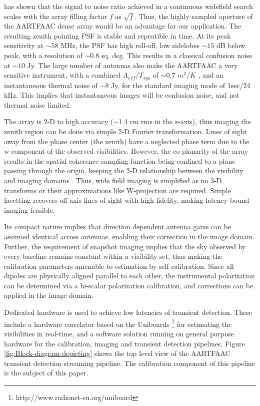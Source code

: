 \documentclass{aa}
\begin{document}
\citet{backer1999pers} has shown that  the signal to noise ratio achieved
in a  continuous widefield search  scales with the  array filling factor  $f$ as
$\sqrt{f}$. Thus, the highly sampled  aperture of the AARTFAAC dense array would
be an advantage for our application. The resulting zenith pointing PSF is stable
and repeatible in  time. At its peak sensitivity at $\sim$$58$  MHz, the PSF has
high  roll-off, low sidelobes  $\sim$$15$ dB  below peak,  with a  resolution of
$\sim$$0.8$ sq.  deg.  This results in a classical confusion noise at $\sim$$10$
Jy.   The large  number of  antennas  also make  the AARTFAAC  a very  sensitive
instrument,     with    a     combined     $A_{eff}/T_{sys}$    of     $\sim$0.7
$m^{2}/K$ \citep{wijnholds2011situ},  and  an   instantaneous  thermal  noise  of
$\sim$8 Jy,  for the standard  imaging mode of  1sec/24 kHz.  This  implies that
instantaneous images will be confusion noise, and not thermal noise limited.

The array is 2-D to high accuracy ($\sim$1.4 cm rms in the z-axis), thus imaging
the zenith region  can be done via simple 2-D  Fourier transformation.  Lines of
sight away from the phase center (the zenith) have a neglected phase term due to
the w-component of the observed  visibilities.  However, the co-planarity of the
array results  in the  spatial coherence sampling  function being confined  to a
plane  passing through  the origin,  keeping  the 2-D  relationship between  the
visibility  and  imaging  domains  \citep{cornwell1992radio}. Thus,  wide  field
imaging  is  simplified  as  no  3-D  transforms  or  their  approximations like
W-projection are required. Simple facetting  recovers off-axis lines of sight
with high fidelity, making latency bound imaging feasible.

Its compact nature implies that direction dependent antenna gains can be assumed
identical  across  antennas, enabling  their  correction  in  the image  domain.
Further, the  requirement of snapshot imaging  implies that the  sky observed by
every  baseline  remains constant  within  a  visibility  set, thus  making  the
calibration parameters  amenable to estimation  by self calibration.   Since all
dipoles  are  physically  aligned  parallel  to  each  other,  the  instrumental
polarization  can be determined  via a  bi-scalar polarization  calibration, and
corrections can be applied in the image domain.

Dedicated  hardware is  used to  achieve low  latencies of  transient detection.
These      include     a      hardware     correlator      based      on     the
Uniboards  \footnote{http://www.radionet-eu.org/uniboard}   for  estimating  the
visibilities in  real-time, and a  software solution running on  general purpose
hardware for the calibration, imaging and transient detection pipelines.  Figure
\ref{fig:Block-diagram-depicting}  shows  the top  level  view  of the  AARTFAAC
transient  detection  streaming pipeline.   The  calibration  component of  this
pipeline is the subject of this paper.
\end{document}
